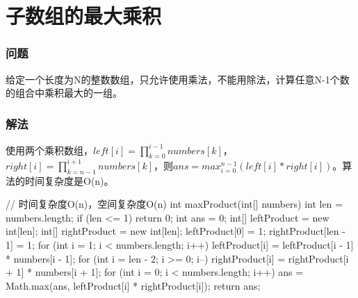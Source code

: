 \section{子数组的最大乘积} %
\label{sec:max-product}

\subsubsection{问题}
给定一个长度为N的整数数组，只允许使用乘法，不能用除法，计算任意N-1个数的组合中乘积最大的一组。

\subsubsection{解法}
使用两个乘积数组，$left[i]=\prod_{k=0}^{i-1}numbers[k]$，$right[i]=\prod_{k=n-1}^{i+1}numbers[k]$，则$ans = max_{i=0}^{n-1}(left[i]*right[i])$。算法的时间复杂度是O(n)。

\begin{Code}
// 时间复杂度O(n)，空间复杂度O(n)
int maxProduct(int[] numbers) {
    int len = numbers.length;
    if (len <= 1) {
        return 0;
    }
    int ans = 0;
    int[] leftProduct = new int[len];
    int[] rightProduct = new int[len];
    leftProduct[0] = 1;
    rightProduct[len - 1] = 1;
    for (int i = 1; i < numbers.length; i++) {
        leftProduct[i] = leftProduct[i - 1] * numbers[i - 1];
    }
    for (int i = len - 2; i >= 0; i--) {
        rightProduct[i] = rightProduct[i + 1] * numbers[i + 1];
    }
    for (int i = 0; i < numbers.length; i++) {
        ans = Math.max(ans, leftProduct[i] * rightProduct[i]);
    }
    return ans;
}
\end{Code}

